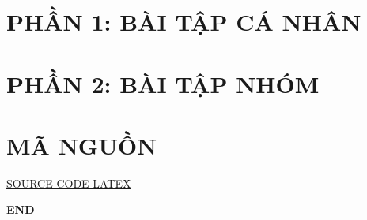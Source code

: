 \documentclass[12pt,a4paper]{article}
\begin{document}
    

    \tableofcontents

    \section*{\LARGE PHẦN 1: BÀI TẬP CÁ NHÂN}

    
    

    \section*{\LARGE PHẦN 2: BÀI TẬP NHÓM}

    

    \section*{\LARGE MÃ NGUỒN}
    \href{https://github.com/langvietthanh/KTMT-BTL.git}{SOURCE CODE LATEX}
    
    \vfill 

    \begin{center}
    \textbf{\LARGE END}
    \end{center}
\end{document}
